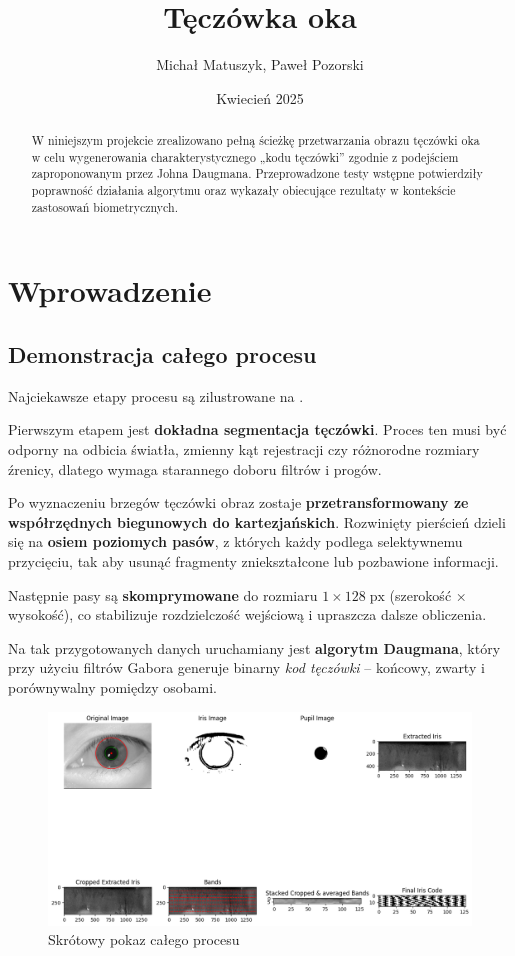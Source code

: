 \documentclass[a4paper]{article}
\title{\textbf{Tęczówka oka}\\[0.5em]}
\author{Michał Matuszyk, Paweł Pozorski}
\date{Kwiecień 2025}
\begin{document}
\maketitle

\begin{abstract}
W niniejszym projekcie zrealizowano pełną ścieżkę przetwarzania obrazu tęczówki oka w celu wygenerowania charakterystycznego „kodu tęczówki” zgodnie z podejściem zaproponowanym przez Johna Daugmana. Przeprowadzone testy wstępne potwierdziły poprawność działania algorytmu oraz wykazały obiecujące rezultaty w kontekście zastosowań biometrycznych.
\end{abstract}

\newpage

\tableofcontents
\newpage

\section{Wprowadzenie}

\subsection*{Demonstracja całego procesu}

Najciekawsze etapy procesu są zilustrowane na .

Pierwszym etapem jest \textbf{dokładna segmentacja tęczówki}.  
Proces ten musi być odporny na odbicia światła, zmienny kąt rejestracji czy różnorodne rozmiary źrenicy, dlatego wymaga starannego doboru filtrów i progów.

Po wyznaczeniu brzegów tęczówki obraz zostaje \textbf{przetransformowany ze współrzędnych biegunowych do kartezjańskich}.  
Rozwinięty pierścień dzieli się na \textbf{osiem poziomych pasów}, z których każdy podlega selektywnemu przycięciu, tak aby usunąć fragmenty zniekształcone lub pozbawione informacji.

Następnie pasy są \textbf{skomprymowane} do rozmiaru \(1 \times 128\;\text{px}\) (szerokość × wysokość), co stabilizuje rozdzielczość wejściową i upraszcza dalsze obliczenia.

Na tak przygotowanych danych uruchamiany jest \textbf{algorytm Daugmana}, który przy użyciu filtrów Gabora generuje binarny \emph{kod tęczówki} – końcowy, zwarty i porównywalny pomiędzy osobami.

\begin{figure}[H]
    \centering
    \includegraphics[width=0.75\linewidth]{figures/entire_process.png}
    \caption{Skrótowy pokaz całego procesu}
    \label{fig:skrot-procesu}
\end{figure}
\end{document}
